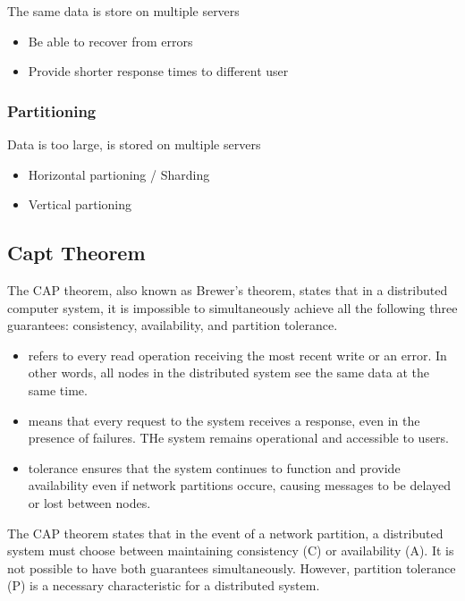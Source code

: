 The same data is store on multiple servers
\begin{itemize}
    \item Be able to recover from errors
    \item Provide shorter response times to different user
\end{itemize}

\subsubsection{Partitioning}

Data is too large, is stored on multiple servers
\begin{itemize}
    \item Horizontal partioning / Sharding
    \item Vertical partioning
\end{itemize}

\subsection{Capt Theorem}

The CAP theorem, also known as Brewer's theorem, states that in a distributed computer system, it is impossible to simultaneously achieve all the following three guarantees: consistency, availability, and partition tolerance.

\begin{itemize}
    \item {} refers to every read operation receiving the most recent write or an error. In other words, all nodes in the distributed system see the same data at the same time.
    \item {} means that every request to the system receives a response, even in the presence of failures. THe system remains operational and accessible to users.
    \item {} tolerance ensures that the system continues to function and provide availability even if network partitions occure, causing messages to be delayed or lost between nodes.
\end{itemize}

The CAP theorem states that in the event of a network partition, a distributed system must choose between maintaining consistency (C) or availability (A). It is not possible to have both guarantees simultaneously. However, partition tolerance (P) is a necessary characteristic for a distributed system.

